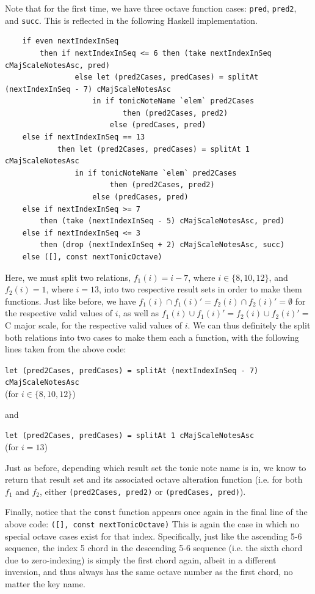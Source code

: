 \documentclass{report}
\begin{document}
Note that for the first time, we have three octave function cases: \verb.pred., \verb.pred2., and \verb.succ.. This is reflected in the following Haskell implementation.

\begin{verbatim}
    if even nextIndexInSeq 
        then if nextIndexInSeq <= 6 then (take nextIndexInSeq cMajScaleNotesAsc, pred)
                else let (pred2Cases, predCases) = splitAt (nextIndexInSeq - 7) cMajScaleNotesAsc
                    in if tonicNoteName `elem` pred2Cases 
                           then (pred2Cases, pred2) 
                        else (predCases, pred)
    else if nextIndexInSeq == 13
            then let (pred2Cases, predCases) = splitAt 1 cMajScaleNotesAsc
                in if tonicNoteName `elem` pred2Cases 
                        then (pred2Cases, pred2)
                    else (predCases, pred)
    else if nextIndexInSeq >= 7
        then (take (nextIndexInSeq - 5) cMajScaleNotesAsc, pred)
    else if nextIndexInSeq <= 3
        then (drop (nextIndexInSeq + 2) cMajScaleNotesAsc, succ)
    else ([], const nextTonicOctave) 
\end{verbatim}

Here, we must split two relations, $f_1(i) = i-7$, where $i \in \{8,10,12\}$, and $f_2(i) = 1$, where $i =13$, into two respective result sets in order to make them functions. Just like before, we have $f_1(i) \cap f_1(i)' = f_2(i) \cap f_2(i)' = \emptyset$ for the respective valid values of $i$, as well as $f_1(i) \cup f_1(i)' = f_2(i) \cup f_2(i)' =$ C major scale, for the respective valid values of $i$. We can thus definitely the split both relations into two cases to make them each a function, with the following lines taken from the above code:

\verb.let (pred2Cases, predCases) = splitAt (nextIndexInSeq - 7) cMajScaleNotesAsc. \\(for $i \in \{8,10,12\}$)

\noindent and 

\verb.let (pred2Cases, predCases) = splitAt 1 cMajScaleNotesAsc. \\(for $i =13$)

Just as before, depending which result set the tonic note name is in, we know to return that result set and its associated octave alteration function (i.e. for both $f_1$ and $f_2$, either \verb.(pred2Cases, pred2). or \verb.(predCases, pred).).

Finally, notice that the \verb.const. function appears once again in the final line of the above code: \verb.([], const nextTonicOctave).  This is again the case in which no special octave cases exist for that index. Specifically, just like the ascending 5-6 sequence, the index 5 chord in the descending 5-6 sequence (i.e. the sixth chord due to zero-indexing) is simply the first chord again, albeit in a different inversion, and thus always has the same octave number as the first chord, no matter the key name.
\end{document}
